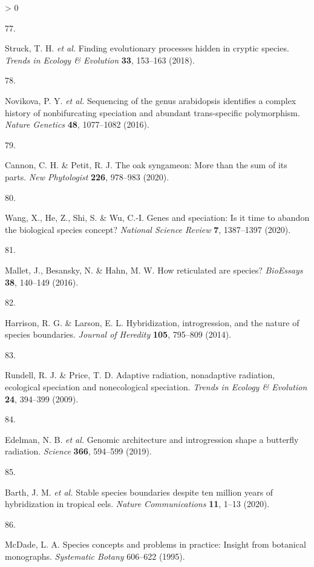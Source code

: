 \documentclass[
  11pt,
]{article}
\newlength{\cslhangindent}
\newlength{\csllabelwidth}
\newenvironment{CSLReferences}[2] %
 {%
  \setlength{\parindent}{0pt}
  \ifodd #1 \everypar{\setlength{\hangindent}{\cslhangindent}}\ignorespaces\fi
  \ifnum #2 > 0
  \setlength{\parskip}{#2\baselineskip}
  \fi
 }%
 {}
\newcommand{\CSLLeftMargin}[1]{\parbox[t]{\csllabelwidth}{#1}}
\newcommand{\CSLRightInline}[1]{\parbox[t]{\linewidth - \csllabelwidth}{#1}\break}
\begin{document}
\begin{CSLReferences}{0}{0}
\leavevmode\hypertarget{ref-struck2018finding}{}%
\CSLLeftMargin{77. }
\CSLRightInline{Struck, T. H. \emph{et al.} Finding evolutionary processes hidden in cryptic species. \emph{Trends in Ecology \& Evolution} \textbf{33}, 153--163 (2018).}

\leavevmode\hypertarget{ref-novikova2016sequencing}{}%
\CSLLeftMargin{78. }
\CSLRightInline{Novikova, P. Y. \emph{et al.} Sequencing of the genus arabidopsis identifies a complex history of nonbifurcating speciation and abundant trans-specific polymorphism. \emph{Nature Genetics} \textbf{48}, 1077--1082 (2016).}

\leavevmode\hypertarget{ref-cannon2020oak}{}%
\CSLLeftMargin{79. }
\CSLRightInline{Cannon, C. H. \& Petit, R. J. The oak syngameon: More than the sum of its parts. \emph{New Phytologist} \textbf{226}, 978--983 (2020).}

\leavevmode\hypertarget{ref-wang2020genes}{}%
\CSLLeftMargin{80. }
\CSLRightInline{Wang, X., He, Z., Shi, S. \& Wu, C.-I. Genes and speciation: Is it time to abandon the biological species concept? \emph{National Science Review} \textbf{7}, 1387--1397 (2020).}

\leavevmode\hypertarget{ref-mallet2016reticulated}{}%
\CSLLeftMargin{81. }
\CSLRightInline{Mallet, J., Besansky, N. \& Hahn, M. W. How reticulated are species? \emph{BioEssays} \textbf{38}, 140--149 (2016).}

\leavevmode\hypertarget{ref-harrison2014hybridization}{}%
\CSLLeftMargin{82. }
\CSLRightInline{Harrison, R. G. \& Larson, E. L. Hybridization, introgression, and the nature of species boundaries. \emph{Journal of Heredity} \textbf{105}, 795--809 (2014).}

\leavevmode\hypertarget{ref-rundell2009adaptive}{}%
\CSLLeftMargin{83. }
\CSLRightInline{Rundell, R. J. \& Price, T. D. Adaptive radiation, nonadaptive radiation, ecological speciation and nonecological speciation. \emph{Trends in Ecology \& Evolution} \textbf{24}, 394--399 (2009).}

\leavevmode\hypertarget{ref-edelman2019genomic}{}%
\CSLLeftMargin{84. }
\CSLRightInline{Edelman, N. B. \emph{et al.} Genomic architecture and introgression shape a butterfly radiation. \emph{Science} \textbf{366}, 594--599 (2019).}

\leavevmode\hypertarget{ref-barth2020stable}{}%
\CSLLeftMargin{85. }
\CSLRightInline{Barth, J. M. \emph{et al.} Stable species boundaries despite ten million years of hybridization in tropical eels. \emph{Nature Communications} \textbf{11}, 1--13 (2020).}

\leavevmode\hypertarget{ref-mcdade1995species}{}%
\CSLLeftMargin{86. }
\CSLRightInline{McDade, L. A. Species concepts and problems in practice: Insight from botanical monographs. \emph{Systematic Botany} 606--622 (1995).}

\end{CSLReferences}
\end{document}
